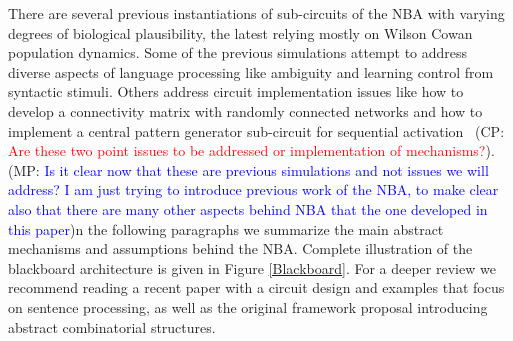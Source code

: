 \documentclass[10pt]{article}
\newcommand{\noteCP}[1]{(CP: \textcolor{red}{#1})}
\newcommand{\noteMP}[3]{(MP: \textcolor{blue}{#1})}
\begin{document}
There are several previous instantiations of sub-circuits of the NBA with varying degrees of biological plausibility, the latest relying mostly on Wilson Cowan population dynamics\cite{Destexhe_2009}.
Some of the previous simulations attempt to address diverse aspects of language processing like ambiguity\cite{Frank_2014} and learning control from syntactic stimuli\cite{van_der_Velde_2010}.
Others address circuit implementation issues like how to develop a connectivity matrix with randomly connected networks\cite{van_der_Velde_2011} and how to implement a central pattern generator sub-circuit for sequential activation~\cite{van_Dijk_2015}
\noteCP{Are these two point issues to be addressed or implementation of mechanisms?}.
\noteMP{Is it clear now that these are previous simulations and not issues we will address? I am just trying to introduce previous work of the NBA, to make clear also that there are many other aspects behind NBA that the one developed in this paper}.
In the following paragraphs we summarize the main abstract mechanisms and assumptions behind the NBA. Complete illustration of the blackboard architecture is given in Figure {\ref{Blackboard}}.
For a deeper review we recommend reading a recent paper with a circuit design and examples that focus on sentence processing\cite{de2016combinatorial}, as well as the original framework proposal introducing abstract combinatorial structures\cite{van_der_Velde_2006}.
\end{document}
